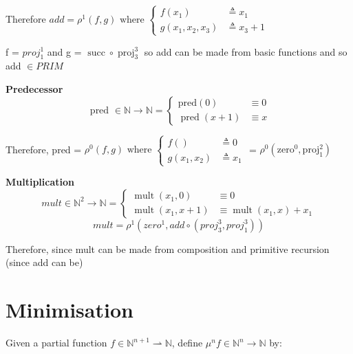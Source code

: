\documentclass{article}
\begin{document}
Therefore $a d d=\rho^{1}(f, g) \text { where } \left\{\begin{array}{ll}{f\left(x_{1}\right)} & {\triangleq x_{1}} \\ {g\left(x_{1}, x_{2}, x_{3}\right)} & {\triangleq x_{3}+1}\end{array}\right.$

f = $proj_{1}^{1}$ and g = $\operatorname{succ} \circ \operatorname{proj}_{3}^{3}$ so add can be made from basic functions and so add $\in PRIM$


\bigskip
\noindent
\textbf{Predecessor}
\begin{equation}
\text { pred } \in \mathbb{N} \rightarrow \mathbb{N} = \left\{\begin{array}{ll}{\text {pred}(0)} & {\equiv 0} \\ {\operatorname{pred}(x+1)} & {\equiv x}\end{array}\right.
\end{equation}

Therefore, pred = $\rho^{0}(f, g) \text { where } \left\{\begin{array}{ll}{f( )} & {\triangleq 0} \\ {g\left(x_{1}, x_{2}\right)} & {\triangleq x_{1}}\end{array}\right.$ = $\rho^{0}\left(\mathrm{zero}^{0}, \mathrm{proj}_{1}^{2}\right)$

\bigskip
\noindent
\textbf{Multiplication}
\begin{equation}
    m u l t \in \mathbb{N}^{2} \rightarrow \mathbb{N} = \left\{\begin{array}{ll}{\operatorname{mult}\left(x_{1}, 0\right)} & {\equiv 0} \\ {\operatorname{mult}\left(x_{1}, x+1\right)} & {\equiv \operatorname{mult}\left(x_{1}, x\right)+x_{1}}\end{array}\right.
\end{equation}
\begin{equation}
    mult = \rho ^{1} (zero^{1}, add \circ (proj^{3}_{3}, proj_{1}^{3}))
\end{equation}

Therefore, since mult can be made from composition and primitive recursion (since add can be)

\section{Minimisation}
Given a partial function $f \in \mathbb{N}^{n+1} \rightharpoonup \mathbb{N}$, define $\mu^{n} f \in \mathbb{N}^{n} \rightarrow \mathbb{N}$ by:
\end{document}
